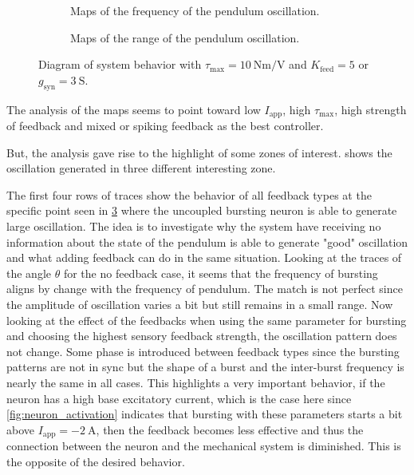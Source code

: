 \begin{figure}[!htbp]
    \centering
    \begin{subfigure}[t][.46\textheight][b]{\textwidth}
        \centering
        \caption{Maps of the frequency of the pendulum oscillation.}
        \label{fig:single_t10_high_freq}
    \end{subfigure}
    
    \begin{subfigure}[b][.46\textheight][t]{\textwidth}
        \centering
        \caption{Maps of the range of the pendulum oscillation.}
        \label{fig:single_t10_high_range}
    \end{subfigure}
    \caption{Diagram of system behavior with $\tau_\text{max}=\qty{10}{\newton\meter\per\volt}$ and $K_\text{feed} = 5$ or $g_{\text{syn}} = \qty{3}{\siemens}$.}
    \label{fig:single_t10_high}
\end{figure}

The analysis of the maps seems to point toward low $I_\text{app}$, high $\tau_\text{max}$, high strength of feedback and mixed or spiking feedback as the best controller.

But, the analysis gave rise to the highlight of some zones of interest.  shows the oscillation generated in three different interesting zone. 

The first four rows of traces show the behavior of all feedback types at the specific point seen in \cref{fig:single_t10_high} where the uncoupled bursting neuron is able to generate large oscillation. The idea is to investigate why the system have receiving no information about the state of the pendulum is able to generate "good" oscillation and what adding feedback can do in the same situation. Looking at the traces of the angle $\theta$ for the no feedback case, it seems that the frequency of bursting aligns by change with the frequency of pendulum. The match is not perfect since the amplitude of oscillation varies a bit but still remains in a small range. Now looking at the effect of the feedbacks when using the same parameter for bursting and choosing the highest sensory feedback strength, the oscillation pattern does not change. Some phase is introduced between feedback types since the bursting patterns are not in sync but the shape of a burst and the inter-burst frequency is nearly the same in all cases. This highlights a very important behavior, if the neuron has a high base excitatory current, which is the case here since \cref{fig:neuron_activation} indicates that bursting with these parameters starts a bit above $I_\text{app} = \qty{-2}{\ampere}$, then the feedback becomes less effective and thus the connection between the neuron and the mechanical system is diminished. This is the opposite of the desired behavior.


